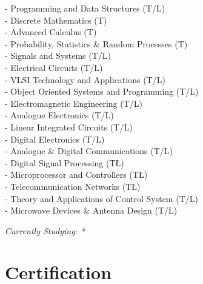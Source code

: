 \documentclass[a4paper,10pt]{extarticle}
\begin{document}
 \begin{multicols}{2}
 - Programming and Data Structures (T/L) \\
 - Discrete Mathematics (T)\\
 - Advanced Calculus (T)\\
 - Probability, Statistics \& Random Processes (T) \\
 - Signals and Systems (T/L) \\
 - Electrical Circuits (T/L) \\
 - VLSI Technology and Applications (T/L)\\
 - Object Oriented Systems and Programming (T/L) \\
 - Electromagnetic Engineering (T/L) \\
 - Analogue Electronics (T/L) \\
 - Linear Integrated Circuits (T/L) \\
 - Digital Electronics (T/L) \\
 - Analogue \& Digital Communications (T/L) \\
 - Digital Signal Processing (T\L) \\
 - Microprocessor and Controllers (T\L) \\
 - Telecommunication Networks (T\L)\\
 - Theory and Applications of Control System (T/L)\\
 - Microwave Devices & Antenna Design (T/L)
 \end{multicols}
 {\itshape{Currently Studying: *}}\\

\vspace{-0.3cm}
\section{\textcolor{primary}{Certification}}
\end{document}
